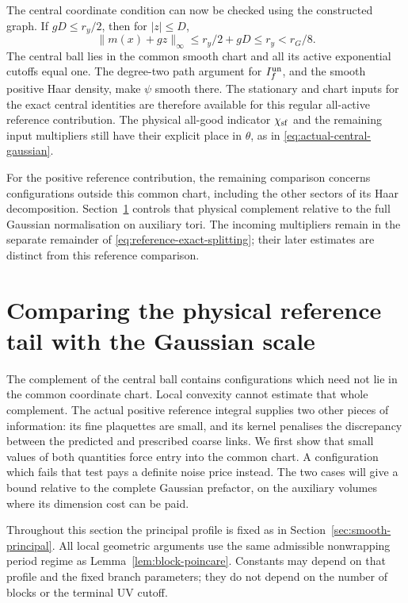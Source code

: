 \documentclass[11pt,reqno]{amsart}
\numberwithin{equation}{section}
\theoremstyle{definition}
\theoremstyle{remark}
\begin{document}
The central coordinate condition can now be checked using
the constructed graph. If \(gD\le r_y/2\), then for \(|z|\le D\),
\[
       \|m(x)+gz\|_\infty
            \le r_y/2+gD\le r_y<r_G/8.
\]
The central ball lies in the common smooth chart and all its
active exponential cutoffs equal one. The degree-two path
argument for \(I_f^{\rm un}\), and the smooth positive Haar density,
make \(\psi\) smooth there. The stationary and chart inputs
for the exact central identities are therefore available for
this regular all-active reference contribution.
The physical all-good indicator \(\chi_{\rm sf}\) and the
remaining input multipliers still have their explicit place in
\(\theta\), as in \eqref{eq:actual-central-gaussian}.

For the positive reference contribution, the remaining comparison
concerns configurations outside this common chart, including the
other sectors of its Haar decomposition.
Section~\ref{sec:physical-tail} controls that physical complement
relative to the full Gaussian normalisation on auxiliary tori.
The incoming multipliers remain in the separate remainder of
\eqref{eq:reference-exact-splitting}; their later estimates are
distinct from this reference comparison.

\section{Comparing the physical reference tail with the Gaussian scale}
\label{sec:physical-tail}

The complement of the central ball contains configurations which
need not lie in the common coordinate chart. Local convexity cannot
estimate that whole complement. The actual positive reference
integral supplies two other pieces of information: its fine
plaquettes are small, and its kernel penalises the discrepancy
between the predicted and prescribed coarse links. We first show
that small values of both quantities force entry into the common
chart. A configuration which fails that test pays a definite noise
price instead. The two cases will give a bound relative to the
complete Gaussian prefactor, on the auxiliary volumes where its
dimension cost can be paid.

Throughout this section the principal profile is fixed as in
Section~\ref{sec:smooth-principal}. All local geometric arguments
use the same admissible nonwrapping period regime as
Lemma~\ref{lem:block-poincare}. Constants may depend on that profile
and the fixed branch parameters; they do not depend on the number
of blocks or the terminal UV cutoff.
\end{document}
